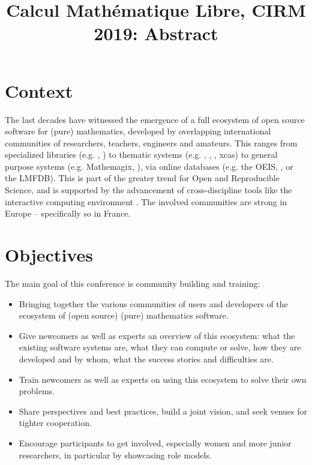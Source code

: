 \documentclass[12pt]{amsart}
\begin{document}
\title{Calcul Mathématique Libre, CIRM 2019: Abstract}
\maketitle
\thispagestyle{empty}

\section*{Context}

The last decades have witnessed the emergence of a full ecosystem of
open source software for (pure) mathematics, developed by overlapping
international communities of researchers, teachers, engineers and
amateurs. This ranges from specialized libraries (e.g. \MPIR, \Linbox)
to thematic systems (e.g. \GAP, \Pari, \Singular, xcas) to general
purpose systems (e.g. Mathemagix, \Sage), via online databases (e.g.
the OEIS, \MathHub, or the LMFDB). This is part of the greater trend
for Open and Reproducible Science, and is supported by the advancement
of cross-discipline tools like the interactive computing environment
\Jupyter. The involved communities are strong in Europe --
specifically so in France.


\section*{Objectives}

The main goal of this conference is community building and training:
\begin{itemize}
\item Bringing together the various communities of users and
  developers of the ecosystem of (open source) (pure) mathematics
  software.
\item Give newcomers as well as experts an overview of this ecosystem:
  what the existing software systems are, what they can compute or solve, how
  they are developed and by whom, what the success stories and
  difficulties are.
\item Train newcomers as well as experts on using this ecosystem to
  solve their own problems.
\item Share perspectives and best practices, build a joint vision, and
  seek venues for tighter cooperation.
\item Encourage participants to get involved, especially
  women and more junior researchers, in particular by showcasing role models.
\end{itemize}
\end{document}
